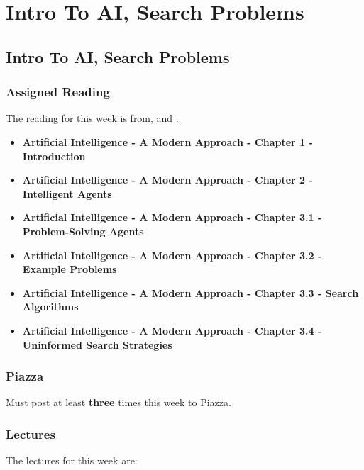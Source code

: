 \clearpage

\newcommand{\ChapTitle}{Intro To AI, Search Problems}
\newcommand{\SectionTitle}{Intro To AI, Search Problems}

\chapter{\ChapTitle}

\section{\SectionTitle}

\subsection{Assigned Reading}

The reading for this week is from, \AITextbook \hspace*{1pt} and \RLTextbook.

\begin{itemize}
    \item \textbf{Artificial Intelligence - A Modern Approach - Chapter 1 - Introduction}
    \item \textbf{Artificial Intelligence - A Modern Approach - Chapter 2 - Intelligent Agents}
    \item \textbf{Artificial Intelligence - A Modern Approach - Chapter 3.1 - Problem-Solving Agents}
    \item \textbf{Artificial Intelligence - A Modern Approach - Chapter 3.2 - Example Problems}
    \item \textbf{Artificial Intelligence - A Modern Approach - Chapter 3.3 - Search Algorithms}
    \item \textbf{Artificial Intelligence - A Modern Approach - Chapter 3.4 - Uninformed Search Strategies}
\end{itemize}

\subsection{Piazza}

Must post at least \textbf{three} times this week to Piazza.

\subsection{Lectures}

The lectures for this week are:

